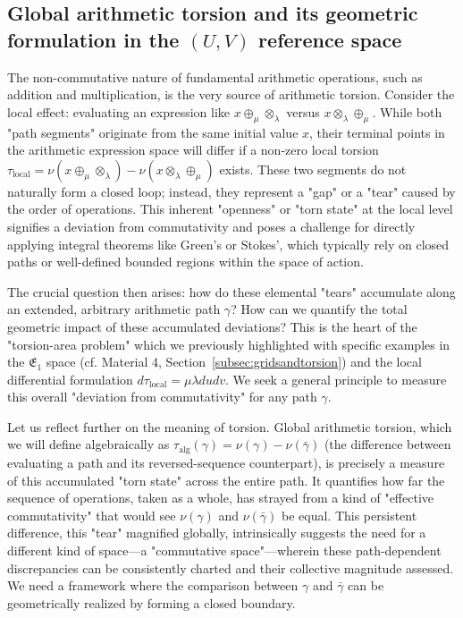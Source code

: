 \subsection{Global arithmetic torsion and its geometric formulation in the $(U,V)$ reference space}
\label{sec:global_torsion_uv_narrative_enhanced}

The non-commutative nature of fundamental arithmetic operations, such as addition and multiplication, is the very source of arithmetic torsion. Consider the local effect: evaluating an expression like $x \oplus_\mu \otimes_\lambda$ versus $x \otimes_\lambda \oplus_\mu$. While both "path segments" originate from the same initial value $x$, their terminal points in the arithmetic expression space will differ if a non-zero local torsion $\tau_{\text{local}} = \nu(x \oplus_\mu \otimes_\lambda) - \nu(x \otimes_\lambda \oplus_\mu)$ exists. These two segments do not naturally form a closed loop; instead, they represent a "gap" or a "tear" caused by the order of operations. This inherent "openness" or "torn state" at the local level signifies a deviation from commutativity and poses a challenge for directly applying integral theorems like Green's or Stokes', which typically rely on closed paths or well-defined bounded regions within the space of action.

The crucial question then arises: how do these elemental "tears" accumulate along an extended, arbitrary arithmetic path $\gamma$? How can we quantify the total geometric impact of these accumulated deviations? This is the heart of the "torsion-area problem" which we previously highlighted with specific examples in the $\mathfrak{E}_1$ space (cf. Material 4, Section~\ref{subsec:gridsandtorsion}) and the local differential formulation $d\tau_{\text{local}} = \mu \lambda du dv$. We seek a general principle to measure this overall "deviation from commutativity" for any path $\gamma$.

Let us reflect further on the meaning of torsion. Global arithmetic torsion, which we will define algebraically as $\tau_{\text{alg}}(\gamma) = \nu(\gamma) - \nu(\bar{\gamma})$ (the difference between evaluating a path and its reversed-sequence counterpart), is precisely a measure of this accumulated "torn state" across the entire path. It quantifies how far the sequence of operations, taken as a whole, has strayed from a kind of "effective commutativity" that would see $\nu(\gamma)$ and $\nu(\bar{\gamma})$ be equal. This persistent difference, this "tear" magnified globally, intrinsically suggests the need for a different kind of space—a "commutative space"—wherein these path-dependent discrepancies can be consistently charted and their collective magnitude assessed. We need a framework where the comparison between $\gamma$ and $\bar{\gamma}$ can be geometrically realized by forming a closed boundary.

